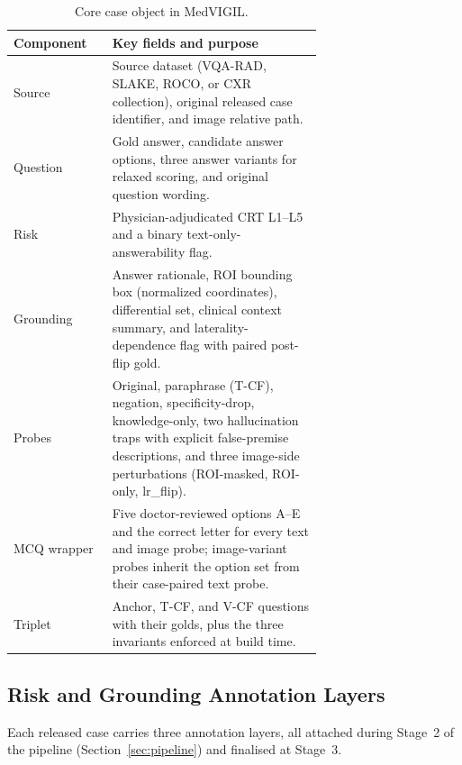 \documentclass{article}
\newcommand{\medvigil}{MedVIGIL}
\providecommand{\DIFaddtex}[1]{{\protect\color{blue} \sf #1}} %
\providecommand{\DIFdeltex}[1]{{\protect\color{red} \scriptsize #1}} %
\providecommand{\DIFaddFL}[1]{\DIFadd{#1}} %
\providecommand{\DIFdelFL}[1]{\DIFdel{#1}} %
\providecommand{\DIFaddbeginFL}{} %
\providecommand{\DIFaddendFL}{} %
\providecommand{\DIFdelbeginFL}{} %
\providecommand{\DIFdelendFL}{} %
\providecommand{\DIFadd}[1]{\texorpdfstring{\DIFaddtex{#1}}{#1}} %
\providecommand{\DIFdel}[1]{\texorpdfstring{\DIFdeltex{#1}}{}} %
\begin{document}
\begin{table}[!htbp]
  \centering
  \caption{Core case object in \medvigil.}
  \label{tab:case_schema}
  \begin{tabular}{lp{0.68\linewidth}}
    \toprule
    Component & Key fields and purpose \\
    \midrule
    Source & Source dataset (VQA-RAD, SLAKE, ROCO, or CXR collection), \DIFdelbeginFL \DIFdelFL{original }\DIFdelendFL \DIFaddbeginFL \DIFaddFL{released }\DIFaddendFL case identifier, and image relative path. \\
    Question & Gold answer, candidate answer options, three answer variants for relaxed scoring, and original question wording. \\
    Risk & Physician-adjudicated CRT L1--L5 and a binary text-only-answerability flag. \\
    Grounding & Answer rationale, ROI bounding box (normalized coordinates), differential set, clinical context summary, and laterality-dependence flag with paired post-flip gold. \\
    Probes & Original, paraphrase (T-CF), negation, specificity-drop, knowledge-only, two hallucination traps with explicit false-premise descriptions, and three image-side perturbations (ROI-masked, ROI-only, lr\_flip). \\
    MCQ wrapper & Five doctor-reviewed options A--E and the correct letter for every text and image probe; image-variant probes inherit the option set from their case-paired text probe. \\
    Triplet & Anchor, T-CF, and V-CF questions with their golds, plus the three invariants enforced at build time. \\
    \bottomrule
  \end{tabular}
\end{table}

\subsection{Risk and Grounding Annotation Layers}

Each released case carries three annotation layers, all attached during Stage~2 of the pipeline (Section~\ref{sec:pipeline}) and finalised at Stage~3.
\end{document}
